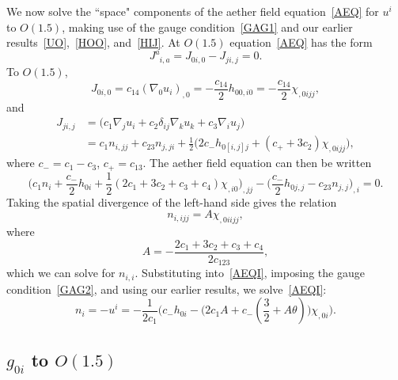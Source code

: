 \documentclass[aps,prd,preprint,amsmath,amssymb]{revtex4}
\def\beq{\begin{equation}}
\def\eeq{\end{equation}}
\def\ph{\phantom}
\def\half{\frac{1}{2}}
\begin{document}
We now solve the ``space" components of the aether field
equation~\eqref{AEQ} for $u^i$ to $O(1.5)$, making use of the gauge
condition~\eqref{GAG1} and our earlier
results~\eqref{UO},~\eqref{HOO}, and~\eqref{HIJ}. At $O(1.5)$ 
equation~\eqref{AEQ} has the form
%
\beq
    J^a_{\ph a i,a} = J_{0i,0}-J_{ji,j}= 0.
\eeq
%
To $O(1.5)$,
%
\beq\label{JOI}
    J_{0i,0} = c_{14} (\nabla_0 u_i)_{,0} =
    -\frac{c_{14}}{2}h_{00,i0}= -\frac{c_{14}}{2}\chi_{,0ijj},
\eeq
%
and
%
\beq\begin{split}
    J_{ji,j} &=\big(c_1\nabla_j u_i + c_2 \delta_{ij} \nabla_k u_k
    + c_3 \nabla_i u_j\big)\\
        &=c_1 n_{i,jj}+c_{23}n_{j,ji}
            +\half\big(2c_-h_{0[i,j]j}+(c_++3c_2)\chi_{,0ijj}\big),
\end{split}
\eeq
%
where $c_- = c_1 - c_3$, $c_+ = c_{13}$.
The aether field equation can then be written
%
\beq\label{AEQI}
    \Big(c_1 n_i + \frac{c_-}{2}h_{0i}
        +\half(2c_1 + 3c_2 + c_3+c_4)\chi_{,i0}\Big)_{,jj}
        -\big(\frac{c_-}{2}h_{0j,j} -c_{23}n_{j,j}\big)_{,i}
        =0.
\eeq
%
Taking the spatial divergence of the left-hand side gives the
relation
%
\beq
    n_{i,ijj} = A \chi_{,0iijj},
\eeq
%
where
%
\beq\label{AAA}
    A = -\frac{2c_1 + 3c_2 + c_3 + c_4}{2 c_{123}},
\eeq
which we can solve for $n_{i,i}$. Substituting into~\eqref{AEQI},
imposing the gauge condition~\eqref{GAG2}, and using our earlier
results, we solve~\eqref{AEQI}:
%
\beq\label{AEI}
    n_i = -u^i=-\frac{1}{2c_1}\Big(c_- h_{0i}
    -\big(2c_1 A + c_-(\frac{3}{2}+A\theta)\big)
    \chi_{,0i}\Big).
\eeq


%
%
\subsection{$g_{0i}$ to $O(1.5)$}
%
\end{document}
